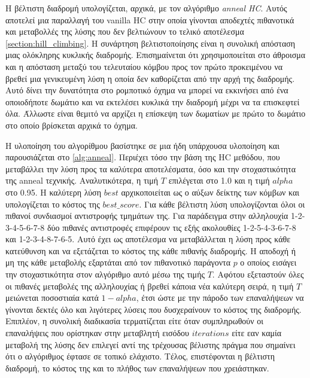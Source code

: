 Η βέλτιστη διαδρομή υπολογίζεται, αρχικά, με τον αλγόριθμο \emph{anneal HC}. Αυτός αποτελεί μια παραλλαγή του vanilla HC στην οποία γίνονται αποδεχτές πιθανοτικά και μεταβολλές της λύσης που δεν βελτιώνουν το τελικό αποτέλεσμα \ref{section:hill_climbing}. Η συνάρτηση βελτιστοποίησης είναι η συνολική απόσταση μιας ολόκληρης κυκλικής διαδρομής. Επισημαίνεται ότι χρησιμοποιείται στο άθροισμα και η απόσταση μεταξύ του τελευταίου κόμβου προς τον πρώτο προκειμένου να βρεθεί μια γενικευμένη λύση η οποία δεν καθορίζεται από την αρχή της διαδρομής. Αυτό δίνει την δυνατότητα στο ρομποτικό όχημα να μπορεί να εκκινήσει από ένα οποιοδήποτε δωμάτιο και να εκτελέσει κυκλικά την διαδρομή μέχρι να τα επισκεφτεί όλα. Άλλωστε είναι θεμιτό να αρχίζει η επίσκεψη των δωματίων με πρώτο το δωμάτιο στο οποίο βρίσκεται αρχικά το όχημα.

Η υλοποίηση του αλγορίθμου βασίστηκε σε μια ήδη υπάρχουσα υλοποίηση \cite{tspHC} και παρουσιάζεται στο \ref{alg:anneal}. Περιέχει τόσο την βάση της HC μεθόδου, που μεταβάλλει την λύση προς τα καλύτερα αποτελέσματα, όσο και την στοχαστικότητα της anneal τεχνικής. Αναλυτικότερα, η τιμή $T$ επιλέγεται στο 1.0 και η τιμή $alpha$ στο 0.95. Η καλύτερη λύση $best$ αρχικοποιείται ως ο αύξων δείκτης των κόμβων και υπολογίζεται το κόστος της $best\_score$. Για κάθε βέλτιστη λύση υπολογίζονται όλοι οι πιθανοί συνδιασμοί αντιστροφής τμημάτων της. Για παράδειγμα στην αλληλουχία 1-2-3-4-5-6-7-8 δύο πιθανές αντιστροφές επιφέρουν τις εξής ακολουθίες 1-2-5-4-3-6-7-8 και 1-2-3-4-8-7-6-5. Αυτό έχει ως αποτέλεσμα να μεταβάλλεται η λύση προς κάθε κατεύθυνση και να εξετάζεται το κόστος της κάθε πιθανής διαδρομής. Η αποδοχή ή μη της κάθε μεταβολής εξαρτάται από τον πιθανοτικό παράγοντα $p$ ο οποίος εισάγει την στοχαστικότητα στον αλγόριθμο αυτό μέσω της τιμής $T$. Αφότου εξεταστούν όλες οι πιθανές μεταβολές της αλληλουχίας ή βρεθεί κάποια νέα καλύτερη σειρά, η τιμή $T$ μειώνεται ποσοστιαία κατά $1 - alpha$, έτσι ώστε με την πάροδο των επαναλήψεων να γίνονται δεκτές όλο και λιγότερες λύσεις που δυσχεραίνουν το κόστος της διαδρομής. Επιπλέον, η συνολική διαδικασία τερματίζεται είτε όταν συμπληρωθούν οι επαναλήψεις που ορίστηκαν στην μεταβλητή εισόδου $iterations$ είτε εαν καμία μεταβολή της λύσης δεν επιλεγεί αντί της τρέχουσας βέλιστης πράγμα που σημαίνει ότι ο αλγόριθμος έφτασε σε τοπικό ελάχιστο. Τέλος, επιστέφονται η βέλτιστη διαδρομή, το κόστος της και το πλήθος των επαναλήψεων που χρειάστηκαν. 

\newpage


